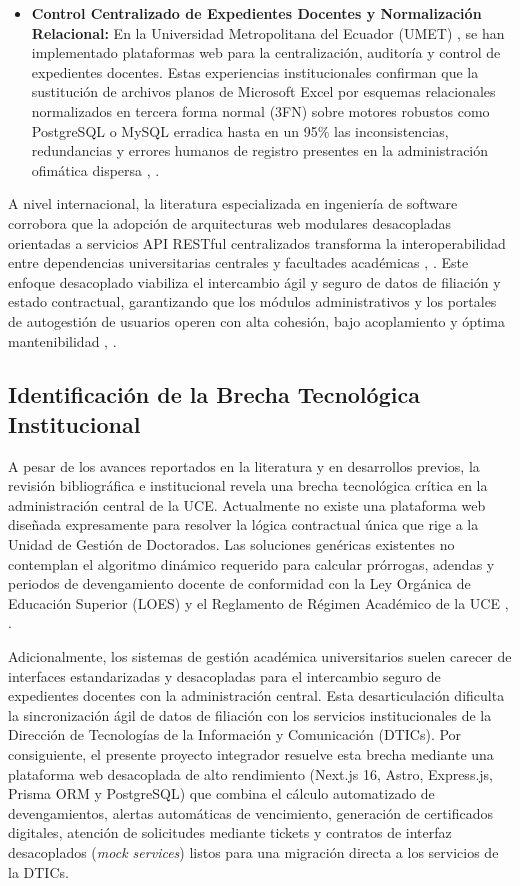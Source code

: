 \begin{itemize}[leftmargin=*]
    \item \textbf{Control Centralizado de Expedientes Docentes y Normalización Relacional:} En la Universidad Metropolitana del Ecuador (UMET) \cite{umet_expedientes}, se han implementado plataformas web para la centralización, auditoría y control de expedientes docentes. Estas experiencias institucionales confirman que la sustitución de archivos planos de Microsoft Excel por esquemas relacionales normalizados en tercera forma normal (3FN) sobre motores robustos como PostgreSQL o MySQL erradica hasta en un 95\% las inconsistencias, redundancias y errores humanos de registro presentes en la administración ofimática dispersa \cite{elmasri}, \cite{silberschatz}.
\end{itemize}

A nivel internacional, la literatura especializada en ingeniería de software corrobora que la adopción de arquitecturas web modulares desacopladas orientadas a servicios API RESTful centralizados transforma la interoperabilidad entre dependencias universitarias centrales y facultades académicas \cite{fielding_rest}, \cite{newman_microservices}. Este enfoque desacoplado viabiliza el intercambio ágil y seguro de datos de filiación y estado contractual, garantizando que los módulos administrativos y los portales de autogestión de usuarios operen con alta cohesión, bajo acoplamiento y óptima mantenibilidad \cite{fowler}, \cite{sommerville_eng}.

\subsection{Identificación de la Brecha Tecnológica Institucional}

A pesar de los avances reportados en la literatura y en desarrollos previos, la revisión bibliográfica e institucional revela una brecha tecnológica crítica en la administración central de la UCE. Actualmente no existe una plataforma web diseñada expresamente para resolver la lógica contractual única que rige a la Unidad de Gestión de Doctorados. Las soluciones genéricas existentes no contemplan el algoritmo dinámico requerido para calcular prórrogas, adendas y periodos de devengamiento docente de conformidad con la Ley Orgánica de Educación Superior (LOES) y el Reglamento de Régimen Académico de la UCE \cite{loes}, \cite{reglamento_uce}.

Adicionalmente, los sistemas de gestión académica universitarios suelen carecer de interfaces estandarizadas y desacopladas para el intercambio seguro de expedientes docentes con la administración central. Esta desarticulación dificulta la sincronización ágil de datos de filiación con los servicios institucionales de la Dirección de Tecnologías de la Información y Comunicación (DTICs). Por consiguiente, el presente proyecto integrador resuelve esta brecha mediante una plataforma web desacoplada de alto rendimiento (Next.js 16, Astro, Express.js, Prisma ORM y PostgreSQL) que combina el cálculo automatizado de devengamientos, alertas automáticas de vencimiento, generación de certificados digitales, atención de solicitudes mediante tickets y contratos de interfaz desacoplados (\textit{mock services}) listos para una migración directa a los servicios de la DTICs.
